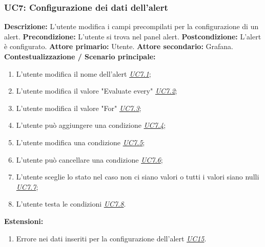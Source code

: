                 \subsubsection{UC7: Configurazione dei dati dell'alert}
                    \textbf{Descrizione:} L’utente modifica i campi precompilati per la configurazione di un alert.
                    \newline
                    \textbf{Precondizione:} L'utente si trova nel panel alert.
                    \newline
                    \textbf{Postcondizione:} L'alert è configurato.
                    \newline
                    \textbf{Attore primario:} Utente.
                    \newline
                    \textbf{Attore secondario:} Grafana.
                    \newline
                    \textbf{Contestualizzazione / Scenario principale:} \begin{enumerate}
                            \item L’utente modifica il nome dell'alert \underline{\textit{UC7.1}};
                            \item L'utente modifica il valore "Evaluate every" \underline{\textit{UC7.2}};
                            \item L'utente modifica il valore "For" \underline{\textit{UC7.3}};
                            \item L'utente può aggiungere una condizione \underline{\textit{UC7.4}};
                            \item L'utente modifica una condizione \underline{\textit{UC7.5}};
                            \item L'utente può cancellare una condizione \underline{\textit{UC7.6}};
                            \item L'utente sceglie lo stato nel caso non ci siano valori o tutti i valori siano nulli \underline{\textit{UC7.7}};
                            \item L'utente testa le condizioni \underline{\textit{UC7.8}}.
                        \end{enumerate}
                        
                \textbf{Estensioni:} 
                    \begin{enumerate}
                            \item Errore nei dati inseriti per la configurazione dell'alert \underline{\textit{UC15}}.
                        \end{enumerate}
        
